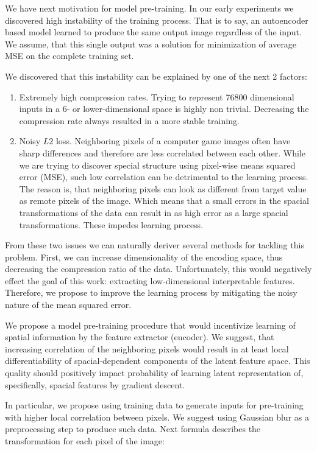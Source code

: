 We have next motivation for model pre-training.
In our early experiments we discovered high instability of the training process.
That is to say, an autoencoder based model learned to produce the same output image regardless of the input.
We assume, that this single output was a solution for minimization of average MSE on the complete training set.

We discovered that this instability can be explained by one of the next 2 factors:
\begin{enumerate}
  \item Extremely high compression rates. Trying to represent 76800 dimensional inputs in a 6- or lower-dimensional space is highly non trivial. Decreasing the compression rate always resulted in a more stable training.
  \item Noisy $L2$ loss. Neighboring pixels of a computer game images often have sharp differences and therefore are less correlated between each other.
  While we are trying to discover special structure using pixel-wise means squared error (MSE), such low correlation can be detrimental to the learning process.
  The reason is, that neighboring pixels can look as different from target value as remote pixels of the image.
  Which means that a small errors in the spacial transformations of the data can result in as high error as a large spacial transformations.
  These impedes learning process.
\end{enumerate}

From these two issues we can naturally deriver several methods for tackling this problem.
First, we can increase dimensionality of the encoding space, thus decreasing the compression ratio of the data.
Unfortunately, this would negatively effect the goal of this work: extracting low-dimensional interpretable features.
Therefore, we propose to improve the learning process by mitigating the noisy nature of the mean squared error.

We propose a model pre-training procedure that would incentivize learning of spatial information by the feature extractor (encoder).
We suggest, that increasing correlation of the neighboring pixels would result in at least local differentiability of spacial-dependent components of the latent feature space.
This quality should positively impact probability of learning latent representation of, specifically, spacial features by gradient descent.

In particular, we propose using training data to generate inputs for pre-training with higher local correlation between pixels.
We suggest using Gaussian blur as a preprocessing step to produce such data.
Next formula describes the transformation for each pixel of the image:

